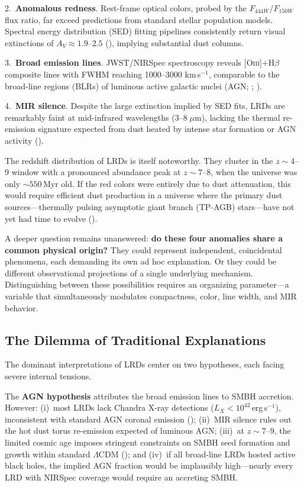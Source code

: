 \documentclass[apj,twocolumn,longbibliography,linenumbers]{aastex701}
\begin{document}
2.~\textbf{Anomalous redness}. Rest-frame optical colors, probed by the $F_{444W}/F_{150W}$ flux ratio, far exceed predictions from standard stellar population models. Spectral energy distribution (SED) fitting pipelines consistently return visual extinctions of $A_V \approx 1.9$--$2.5$ (\citealt{Kokorev2024}), implying substantial dust columns.

3.~\textbf{Broad emission lines}. JWST/NIRSpec spectroscopy reveals [O\textsc{iii}]+H$\beta$ composite lines with FWHM reaching 1000--3000 km\,s$^{-1}$, comparable to the broad-line regions (BLRs) of luminous active galactic nuclei (AGN; \citealt{Matthee2024}; \citealt{Carnall2024}).

4.~\textbf{MIR silence}. Despite the large extinction implied by SED fits, LRDs are remarkably faint at mid-infrared wavelengths ($3$--$8\;\mu$m), lacking the thermal re-emission signature expected from dust heated by intense star formation or AGN activity (\citealt{PerezGonzalez2023}).

The redshift distribution of LRDs is itself noteworthy. They cluster in the $z \sim 4$--$9$ window with a pronounced abundance peak at $z \sim 7$--$8$, when the universe was only ${\sim}550$\,Myr old. If the red colors were entirely due to dust attenuation, this would require efficient dust production in a universe where the primary dust sources---thermally pulsing asymptotic giant branch (TP-AGB) stars---have not yet had time to evolve (\citealt{Venturi2024}).

A deeper question remains unanswered: \textbf{do these four anomalies share a common physical origin?} They could represent independent, coincidental phenomena, each demanding its own ad hoc explanation. Or they could be different observational projections of a single underlying mechanism. Distinguishing between these possibilities requires an organizing parameter---a variable that simultaneously modulates compactness, color, line width, and MIR behavior.

\subsection{The Dilemma of Traditional Explanations}

The dominant interpretations of LRDs center on two hypotheses, each facing severe internal tensions.

The \textbf{AGN hypothesis} attributes the broad emission lines to SMBH accretion. However: (i)~most LRDs lack Chandra X-ray detections ($L_X < 10^{42}$\,erg\,s$^{-1}$), inconsistent with standard AGN coronal emission (\citealt{Kocevski2024}); (ii)~MIR silence rules out the hot dust torus re-emission expected of luminous AGN; (iii)~at $z \sim 7$--$9$, the limited cosmic age imposes stringent constraints on SMBH seed formation and growth within standard $\Lambda$CDM (\citealt{Volonteri2021}); and (iv)~if all broad-line LRDs hosted active black holes, the implied AGN fraction would be implausibly high---nearly every LRD with NIRSpec coverage would require an accreting SMBH.
\end{document}
